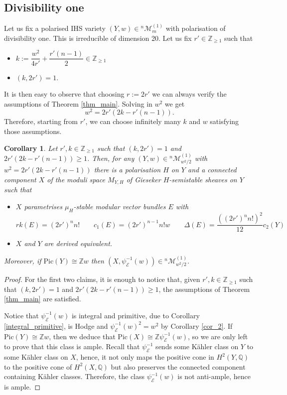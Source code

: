 \documentclass[12pt,a4paper]{amsart}
\theoremstyle{plain}
\newtheorem{cor}[thm]{Corollary}
\theoremstyle{definition}
\theoremstyle{remark}
\def\Pic{\mathrm{Pic}}
\def\Z{\mathbb{Z}}
\def\QQ{\mathbb{Q}}
\newcommand{\kE}{\mathcal{E}}
\newcommand{\ZZ}{\mathbb{Z}}
\newcommand{\rathodge}[1]{\psi_{#1}}
\newcommand{\cc}{c}
\begin{document}
\subsection{Divisibility one}
Let us fix a polarised IHS variety $(Y,w)\in {}^{n}\mathcal{M}_{m}^{(1)}$ with polarisation of divisibility one. 
This is irreducible of dimension 20.
Let us fix $r'\in \ZZ_{\geq 1}$ such that
\begin{itemize}
    \item $k:=\dfrac{w^2}{4r'}+\dfrac{r'(n-1)}{2}\in \ZZ_{\geq 1}$
    \item $(k,2r')=1$.
\end{itemize}
It is then easy to observe that choosing $r:=2r'$ we can always verify the assumptions of Theorem \ref{thm_main}.
Solving in $w^2$ we get
\[
w^2=2r'(2k-r'(n-1)).
\]
Therefore, starting from $r'$, we can choose infinitely many $k$ and $w$ satisfying those assumptions.
\begin{cor}\label{cor_div1}
    Let  $r',k\in \ZZ_{\geq 1}$ such that $(k,2r')=1$ and $2r'(2k-r'(n-1))\geq 1$.
    Then, for any $(Y,w)\in {}^{n}\mathcal{M}_{w^2/2}^{(1)}$ with $w^2=2r'(2k-r'(n-1))$ there is a polarisation $H$ on $Y$ and a connected component $X$ of the moduli space $M_{Y,H}$ of Gieseker $H$-semistable sheaves on $Y$ such that
    \begin{itemize}
        \item $X$ parametrises $\mu_H$-stable modular vector bundles $E$ with 
        \[rk(E)=(2r')^n n! \qquad c_1(E)=(2r')^{n-1}n!w \qquad \Delta(E)=\frac{((2r')^n n!)^2}{12}\cc_2(Y)\]
        \item $X$ and $Y$ are derived equivalent.
    \end{itemize}
    Moreover, if $\Pic(Y)\cong \Z w$ then $(X,\rathodge{\kE}^{-1}(w))\in {}^{n}\mathcal{M}_{w^2/2}^{(1)}$.
\end{cor}
\begin{proof}
    For the first two claims, it is enough to notice that, given $r',k\in \ZZ_{\geq 1}$ such that $(k,2r')=1$ and $2r'(2k-r'(n-1))\geq 1$, the assumptions of Theorem \ref{thm_main} are satisfied.
    
     Notice that $\rathodge{\kE}^{-1}(w)$ is integral and primitive, due to Corollary \ref{integral_primitive}, is Hodge and $\rathodge{\kE}^{-1}(w)^2=w^2$ by Corollary \ref{cor_2}.
    If $\Pic(Y)\cong \Z w$, then we deduce that $\Pic(X)\cong \Z\rathodge{\kE}^{-1}(w)$, so we are only left to prove that this class is ample.
    Recall that $\rathodge{\kE}^{-1}$ sends some K\"ahler class on $Y$ to some K\"ahler class on $X$, hence, it not only maps the positive cone in $H^2(Y,\QQ)$ to the positive cone of $H^2(X,\QQ)$ but also preserves the connected component containing K\"ahler classes.
    Therefore, the class $\rathodge{\kE}^{-1}(w)$ is not anti-ample, hence is ample.
\end{proof}
\end{document}
